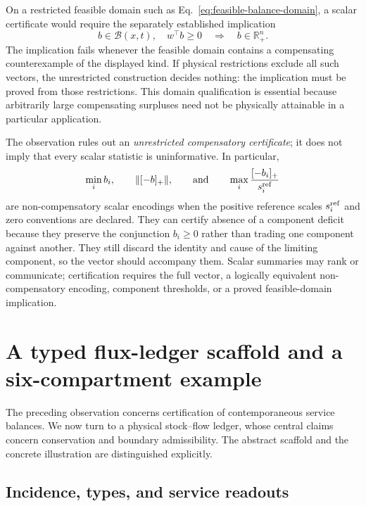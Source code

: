 \documentclass[11pt]{article}
\newcommand{\R}{\mathbb R}
\begin{document}
On a restricted feasible domain such as Eq.~\eqref{eq:feasible-balance-domain}, a scalar certificate would require the separately established implication
\[
b\in\mathcal B(x,t),
\quad w^\top b\ge0
\quad\Longrightarrow\quad
b\in\R_+^n.
\]
The implication fails whenever the feasible domain contains a compensating counterexample of the displayed kind. If physical restrictions exclude all such vectors, the unrestricted construction decides nothing: the implication must be proved from those restrictions. This domain qualification is essential because arbitrarily large compensating surpluses need not be physically attainable in a particular application.

The observation rules out an \emph{unrestricted compensatory certificate}; it does not imply that every scalar statistic is uninformative. In particular,
\[
\min_i b_i,
\qquad
\|[-b]_+\|,
\qquad\text{and}\qquad
\max_i\frac{[-b_i]_+}{s_i^{\rm ref}}
\]
are non-compensatory scalar encodings when the positive reference scales $s_i^{\rm ref}$ and zero conventions are declared. They can certify absence of a component deficit because they preserve the conjunction $b_i\ge0$ rather than trading one component against another. They still discard the identity and cause of the limiting component, so the vector should accompany them. Scalar summaries may rank or communicate; certification requires the full vector, a logically equivalent non-compensatory encoding, component thresholds, or a proved feasible-domain implication.

\section{A typed flux-ledger scaffold and a six-compartment example}

The preceding observation concerns certification of contemporaneous service balances. We now turn to a physical stock--flow ledger, whose central claims concern conservation and boundary admissibility. The abstract scaffold and the concrete illustration are distinguished explicitly.

\subsection{Incidence, types, and service readouts}
\end{document}
